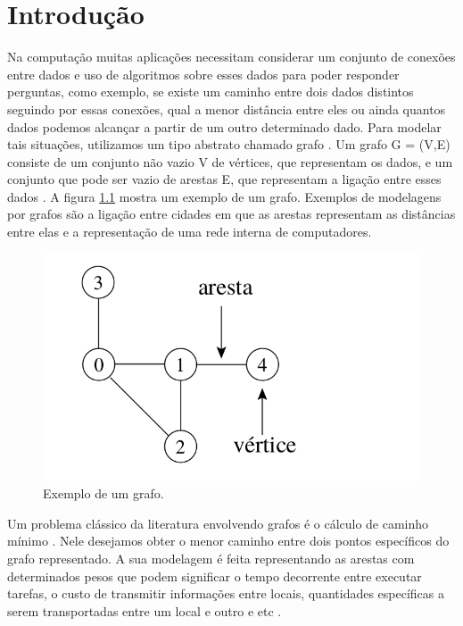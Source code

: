 \chapter{Introdução}
\label{sec-intro}
Na computação muitas aplicações necessitam considerar um conjunto de conexões entre dados e uso de algoritmos sobre esses dados para poder responder perguntas, como exemplo, se existe um caminho entre dois dados distintos seguindo por essas conexões, qual a menor distância entre eles ou ainda quantos dados podemos alcançar a partir de um outro determinado dado. Para modelar tais situações, utilizamos um tipo abstrato chamado grafo \cite{ziviani2004projeto}. Um grafo G = (V,E) consiste de um conjunto não vazio V de vértices, que representam os dados, e um conjunto que pode ser vazio de arestas E, que representam a ligação entre esses dados \cite{diestel}. A figura \ref{fig-intro-exemplografo} mostra um exemplo de um grafo. Exemplos de modelagens por grafos são a ligação entre cidades em que as arestas representam as distâncias entre elas e a representação de uma rede interna de computadores. 

\begin{figure}[H]
\centering
\includegraphics[width=.65\textwidth]{figuras/grafo-exemplo} 
\caption{Exemplo de um grafo.}
\label{fig-intro-exemplografo}
\end{figure}

Um problema clássico da literatura envolvendo grafos é o cálculo de caminho mínimo \cite{moura2010estudo}. Nele desejamos obter o menor caminho entre dois pontos específicos do grafo representado. A sua modelagem é feita representando as arestas com determinados pesos que podem significar o tempo decorrente entre executar tarefas, o custo de transmitir informações entre locais, quantidades específicas a serem transportadas entre um local e outro e etc \cite{drozdek2012data}. 


